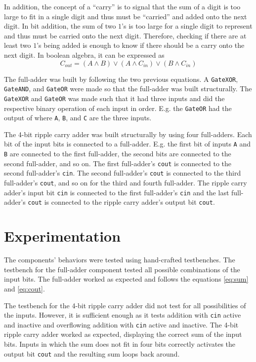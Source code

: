 \documentclass[11pt]{report}
\begin{document}
In addition, the concept of a ``carry'' is to signal that the sum of a digit is too large to fit in
a single digit and thus must be ``carried'' and added onto the next digit. In bit addition, the sum
of two $1$'s is too large for a single digit to represent and thus must be carried onto the next
digit. Therefore, checking if there are at least two $1$'s being added  is enough to know if there
should be a carry onto the next digit. In boolean algebra, it can be expressed as
\begin{equation}
    C_{out} = (A \land B) \lor (A \land C_{in}) \lor (B \land C_{in}) \label{eq:cout}
\end{equation}

The full-adder was built by following the two previous equations. A \verb|GateXOR|, \verb|GateAND|,
and \verb|GateOR| were made so that the full-adder was built structurally. The \verb|GateXOR| and
\verb|GateOR| was made such that it had three inputs and did the respective binary operation of each
input in order. E.g. the \verb|GateOR| had the output of  where \verb|A|,
\verb|B|, and \verb|C| are the three inputs.

The 4-bit ripple carry adder was built structurally by using four full-adders. Each bit of the input
bits is connected to a full-adder. E.g. the first bit of inputs \verb|A| and \verb|B| are connected
to the first full-adder, the second bits are connected to the second full-adder, and so on. The
first full-adder's \verb|cout| is connected to the second full-adder's \verb|cin|. The second
full-adder's \verb|cout| is connected to the third full-adder's \verb|cout|, and so on for the third
and fourth full-adder. The ripple carry adder's input bit \verb|cin| is connected to the first
full-adder's \verb|cin| and the last full-adder's \verb|cout| is connected to the ripple carry
adder's output bit \verb|cout|.

\section*{Experimentation}
The components' behaviors were tested using hand-crafted testbenches. The testbench for the
full-adder component tested all possible combinations of the input bits. The full-adder worked as
expected and follows the equations \eqref{eq:sum} and \eqref{eq:cout}. 

The testbench for the 4-bit ripple carry adder did not test for all possibilities of the inputs.
However, it is sufficient enough as it tests addition with \verb|cin| active and inactive and
overflowing addition with \verb|cin| active and inactive. The 4-bit ripple carry adder worked as
expected, displaying the correct sum of the input bits. Inputs in which the sum does not fit in four
bits correctly activates the output bit \verb|cout| and the resulting sum loops back around.
\end{document}
